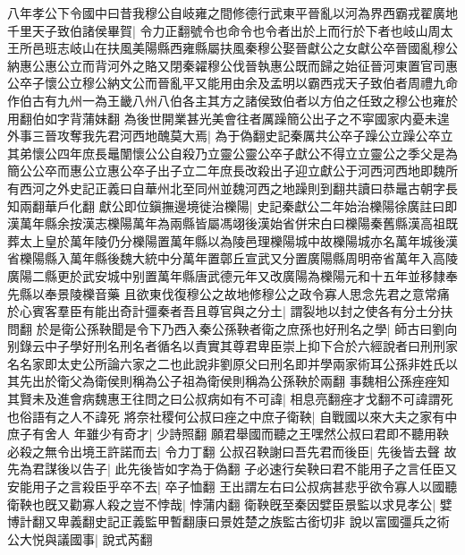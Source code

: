 八年孝公下令國中曰昔我穆公自岐雍之間修德行武東平晉亂以河為界西霸戎翟廣地千里天子致伯諸侯畢賀|{
	令力正翻號令也命令也令者出於上而行於下者也岐山周太王所邑班志岐山在扶風美陽縣西雍縣屬扶風秦穆公娶晉獻公之女獻公卒晉國亂穆公納惠公惠公立而背河外之賂又閉秦糴穆公伐晉執惠公既而歸之始征晉河東置官司惠公卒子懷公立穆公納文公而晉亂平又能用由余及孟明以霸西戎天子致伯者周禮九命作伯古有九州一為王畿八州八伯各主其方之諸侯致伯者以方伯之任致之穆公也雍於用翻伯如字背蒲妹翻}
為後世開業甚光美會往者厲躁簡公出子之不寜國家内憂未遑外事三晉攻奪我先君河西地醜莫大焉|{
	為于偽翻史記秦厲共公卒子躁公立躁公卒立其弟懷公四年庶長鼂闈懷公公自殺乃立靈公靈公卒子獻公不得立立靈公之季父是為簡公公卒而惠公立惠公卒子出子立二年庶長改殺出子迎立獻公于河西河西地即魏所有西河之外史記正義曰自華州北至同州並魏河西之地躁則到翻共讀曰恭鼂古朝字長知兩翻華戶化翻}
獻公即位鎭撫邊境徙治櫟陽|{
	史記秦獻公二年始治櫟陽徐廣註曰即漢萬年縣余按漢志櫟陽萬年為兩縣皆屬馮翊後漢始省併宋白曰櫟陽秦舊縣漢高祖既葬太上皇於萬年陵仍分櫟陽置萬年縣以為陵邑理櫟陽城中故櫟陽城亦名萬年城後漢省櫟陽縣入萬年縣後魏大統中分萬年置鄣丘宣武又分置廣陽縣周明帝省萬年入高陵廣陽二縣更於武安城中别置萬年縣唐武德元年又改廣陽為櫟陽元和十五年並移隸奉先縣以奉景陵櫟音藥}
且欲東伐復穆公之故地修穆公之政令寡人思念先君之意常痛於心賓客羣臣有能出奇計彊秦者吾且尊官與之分土|{
	謂裂地以封之使各有分土分扶問翻}
於是衛公孫鞅聞是令下乃西入秦公孫鞅者衛之庶孫也好刑名之學|{
	師古曰劉向别錄云中子學好刑名刑名者循名以責實其尊君卑臣崇上抑下合於六經說者曰刑刑家名名家即太史公所論六家之二也此說非劉原父曰刑名即并學兩家術耳公孫非姓氏以其先出於衛父為衛侯則稱為公子祖為衛侯則稱為公孫鞅於兩翻}
事魏相公孫痤痤知其賢未及進會病魏惠王往問之曰公叔病如有不可諱|{
	相息亮翻痤才戈翻不可諱謂死也俗語有之人不諱死}
將奈社稷何公叔曰痤之中庶子衛鞅|{
	自戰國以來大夫之家有中庶子有舍人}
年雖少有奇才|{
	少詩照翻}
願君舉國而聽之王嘿然公叔曰君即不聽用鞅必殺之無令出境王許諾而去|{
	令力丁翻}
公叔召鞅謝曰吾先君而後臣|{
	先後皆去聲}
故先為君謀後以告子|{
	此先後皆如字為于偽翻}
子必速行矣鞅曰君不能用子之言任臣又安能用子之言殺臣乎卒不去|{
	卒子恤翻}
王出謂左右曰公叔病甚悲乎欲令寡人以國聽衛鞅也旣又勸寡人殺之豈不悖哉|{
	悖蒲内翻}
衛鞅旣至秦因嬖臣景監以求見孝公|{
	嬖博計翻又卑義翻史記正義監甲暫翻康曰景姓楚之族監古銜切非}
說以富國彊兵之術公大悦與議國事|{
	說式芮翻}


